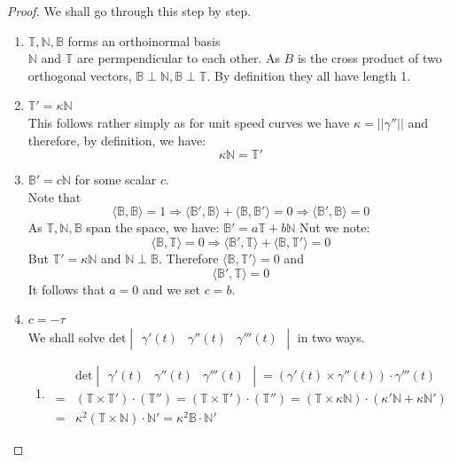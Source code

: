 \documentclass[oneside]{book}\twocolumn
\begin{document}
\begin{proof} We shall go through this step by step.
	\begin{enumerate}
		\item {$\mathbb{T},\mathbb{N},\mathbb{B}$} forms an orthoinormal basis\\
			$\mathbb N$ and $\mathbb T$ are permpendicular to each other. As $B$ is the cross product of two orthogonal vectors, $\mathbb B\perp\mathbb{N},\mathbb{B}\perp\mathbb{T}$. By definition they all have length 1.
		\item $\mathbb T'=\kappa \mathbb N$\\
		This follows rather simply as for unit speed curves we have $\kappa=||\gamma''||$ and therefore, by definition, we have:
		$$\kappa\mathbb N=\mathbb T'$$
		\item $\mathbb B'=c\mathbb N$ for some scalar $c$.\\
			Note that
			$$\langle \mathbb B,\mathbb B\rangle=1\Rightarrow \langle \mathbb B',\mathbb B\rangle+\langle \mathbb B,\mathbb B'\rangle=0\Rightarrow \langle \mathbb B',\mathbb B\rangle=0$$
			As $\mathbb T,\mathbb N,\mathbb B$ span the space, we have: $\mathbb B'=a\mathbb T+b\mathbb N$
			Nut we note:
			$$\langle\mathbb B,\mathbb T \rangle=0\Rightarrow \langle\mathbb  B',\mathbb T\rangle+\langle \mathbb B,\mathbb T'\rangle=0$$
			But $\mathbb T'=\kappa \mathbb N$ and $\mathbb N\perp \mathbb B$. Therefore $\langle \mathbb B,\mathbb T'\rangle=0$ and 
			$$\langle\mathbb  B',\mathbb T\rangle=0$$
			It follows that $a=0$ and we set $c=b$.
		\item $c=-\tau$\\
			We shall solve $\text{det}\begin{vmatrix}
				\gamma'(t)&\gamma''(t)&\gamma'''(t)
			\end{vmatrix}$
			in two ways.
			\begin{enumerate}
				\item 
				\begin{align*}
					&\text{det}\begin{vmatrix}
						\gamma'(t)&\gamma''(t)&\gamma'''(t)
					\end{vmatrix}=\left(\gamma'(t)\times\gamma''(t)\right)\cdot\gamma'''(t)\\
					=&(\mathbb  T\times\mathbb T' )\cdot(\mathbb T'')=(\mathbb  T\times\mathbb T' )\cdot(\mathbb T'')=(\mathbb  T\times\kappa\mathbb  N)\cdot(\kappa'\mathbb  N+\kappa\mathbb  N')\\
					=&\kappa^2(\mathbb  T\times\mathbb  N)\cdot \mathbb  N'=\kappa^2 \mathbb  B\cdot\mathbb  N'

\end{align*}
\end{enumerate}
\end{enumerate}
\end{proof}
\end{document}
